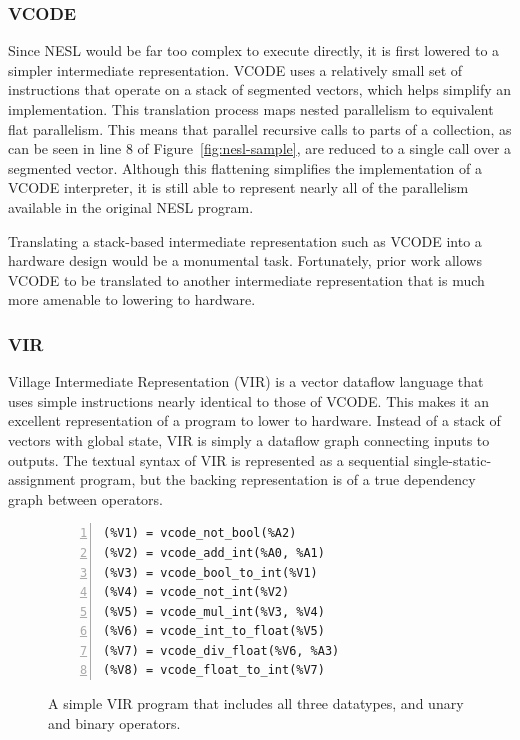 \documentclass[sigconf, nonacm]{acmart}
\begin{document}
\subsubsection{VCODE}
\label{sec:vcode}

Since NESL would be far too complex to execute directly, it is first lowered to a simpler intermediate representation.
VCODE uses a relatively small set of instructions that operate on a stack of segmented vectors, which helps simplify an implementation.
This translation process maps nested parallelism to equivalent flat parallelism.
This means that parallel recursive calls to parts of a collection, as can be seen in line 8 of Figure~\ref{fig:nesl-sample}, are reduced to a single call over a segmented vector.
Although this flattening simplifies the implementation of a VCODE interpreter, it is still able to represent nearly all of the parallelism available in the original NESL program.

Translating a stack-based intermediate representation such as VCODE into a hardware design would be a monumental task.
Fortunately, prior work allows VCODE to be translated to another intermediate representation that is much more amenable to lowering to hardware.

\subsubsection{VIR}
\label{sec:vir}

Village Intermediate Representation (VIR) is a vector dataflow language that uses simple instructions nearly identical to those of VCODE.
This makes it an excellent representation of a program to lower to hardware.
Instead of a stack of vectors with global state, VIR is simply a dataflow graph connecting inputs to outputs.
The textual syntax of VIR is represented as a sequential single-static-assignment program, but the backing representation is of a true dependency graph between operators.

\begin{figure}
	\begin{center}
		\begin{lstlisting}[numbers=left]
(%V1) = vcode_not_bool(%A2)
(%V2) = vcode_add_int(%A0, %A1)
(%V3) = vcode_bool_to_int(%V1)
(%V4) = vcode_not_int(%V2)
(%V5) = vcode_mul_int(%V3, %V4)
(%V6) = vcode_int_to_float(%V5)
(%V7) = vcode_div_float(%V6, %A3)
(%V8) = vcode_float_to_int(%V7)
		\end{lstlisting}
	\end{center}
	\caption{A simple VIR program that includes all three datatypes, and unary and binary operators.}
	\label{fig:vir-sample}
\end{figure}
\end{document}
